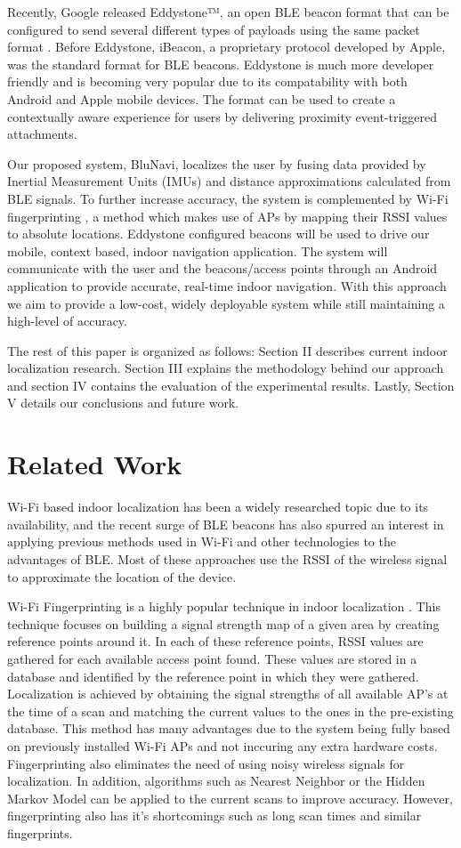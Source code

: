 \documentclass[conference]{IEEEtran}
\begin{document}
Recently, Google released Eddystone™, an open BLE beacon format that can be configured to send several different types of payloads using the same packet format \cite{developers.google.com}. Before Eddystone, iBeacon, a proprietary protocol developed by Apple, was the standard format for BLE beacons. Eddystone is much more developer friendly and is becoming very popular due to its compatability with both Android and Apple mobile devices. The format can be used to create a contextually aware experience for users by delivering proximity event-triggered attachments.

Our proposed system, BluNavi, localizes the user by fusing data provided by Inertial Measurement Units (IMUs) and distance approximations calculated from BLE signals. To further increase accuracy, the system is complemented by Wi-Fi fingerprinting , a method which makes use of APs by mapping their RSSI values to absolute locations. Eddystone configured beacons will be used to drive our mobile, context based, indoor navigation application. The system will communicate with the user and the beacons/access points through an Android application to provide accurate, real-time indoor navigation. With this approach we aim to provide a low-cost, widely deployable system while still maintaining  a high-level of accuracy.

The rest of this paper is organized as follows: Section II describes current indoor localization research. Section III explains the methodology behind our approach and section IV contains the evaluation of the experimental results. Lastly, Section V details our conclusions and future work.

\section{Related Work}
Wi-Fi based indoor localization has been a widely researched topic due to its availability, and the recent surge of BLE beacons has also spurred an interest in applying previous methods used in Wi-Fi and other technologies to the advantages of BLE. Most of these approaches use the RSSI of the wireless signal to approximate the location of the device.

Wi-Fi Fingerprinting is a highly popular technique in indoor localization \cite{chan2012indoor,navarro2010wi}. This technique focuses on  building a signal strength map of a given area by creating reference points around it. In each of these reference points, RSSI values are gathered for each available access point found. These values are stored in a database and identified by the reference point in which they were gathered. Localization is achieved by obtaining the signal strengths of all available AP’s at the time of a scan and matching the current values to the ones in the pre-existing database. This method has many advantages due to the system being fully based on previously installed Wi-Fi APs and not inccuring any extra hardware costs. Fingerprinting also eliminates the need of using noisy wireless signals for localization. In addition, algorithms such as Nearest Neighbor or the Hidden Markov Model can be applied to the current scans to improve accuracy. However, fingerprinting also has it’s shortcomings such as long scan times and similar fingerprints.
\end{document}
